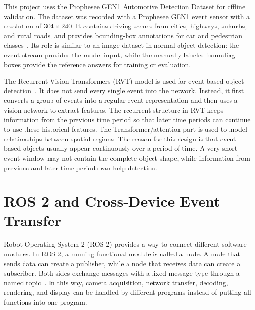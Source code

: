 This project uses the Prophesee GEN1 Automotive Detection Dataset for offline validation. The dataset was recorded with a Prophesee GEN1 event sensor with a resolution of $304\times240$. It contains driving scenes from cities, highways, suburbs, and rural roads, and provides bounding-box annotations for car and pedestrian classes~\parencite{propheseeAutomotiveToolbox,gehrig2023}. Its role is similar to an image dataset in normal object detection: the event stream provides the model input, while the manually labeled bounding boxes provide the reference answers for training or evaluation.

The Recurrent Vision Transformers (RVT) model is used for event-based object detection~\parencite{gehrig2023}. It does not send every single event into the network. Instead, it first converts a group of events into a regular event representation and then uses a vision network to extract features. The recurrent structure in RVT keeps information from the previous time period so that later time periods can continue to use these historical features. The Transformer/attention part is used to model relationships between spatial regions. The reason for this design is that event-based objects usually appear continuously over a period of time. A very short event window may not contain the complete object shape, while information from previous and later time periods can help detection.


\section{ROS 2 and Cross-Device Event Transfer}

Robot Operating System 2 (ROS 2) provides a way to connect different software modules. In ROS 2, a running functional module is called a node. A node that sends data can create a publisher, while a node that receives data can create a subscriber. Both sides exchange messages with a fixed message type through a named topic~\parencite{ros2CppPubSubFoxy}. In this way, camera acquisition, network transfer, decoding, rendering, and display can be handled by different programs instead of putting all functions into one program.

